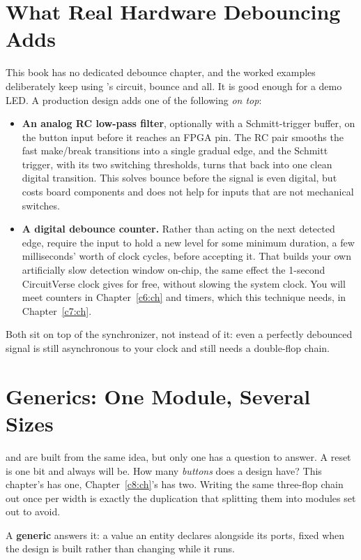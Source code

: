 \section{What Real Hardware Debouncing Adds}
\label{c4:a7}
This book has no dedicated debounce chapter, and the worked examples deliberately keep using
's circuit, bounce and all. It is good enough for a demo LED. A production design adds
one of the following \emph{on top}:
\begin{itemize}
  \item \textbf{An analog RC low-pass filter}, optionally with a Schmitt-trigger buffer, on the
    button input before it reaches an FPGA pin. The RC pair smooths the fast make/break transitions
    into a single gradual edge, and the Schmitt trigger, with its two switching thresholds, turns
    that back into one clean digital transition. This solves bounce before the signal is even
    digital, but costs board components and does not help for inputs that are not mechanical
    switches.
  \item \textbf{A digital debounce counter.} Rather than acting on the next detected edge, require
    the input to hold a new level for some minimum duration, a few milliseconds' worth of clock
    cycles, before accepting it. That builds your own artificially slow detection window on-chip,
    the same effect the 1-second CircuitVerse clock gives for free, without slowing the system
    clock. You will meet counters in Chapter~\ref{c6:ch} and timers, which this technique needs, in
    Chapter~\ref{c7:ch}.
\end{itemize}
Both sit on top of the synchronizer, not instead of it: even a perfectly debounced signal is still
asynchronous to your clock and still needs a double-flop chain.

\section{Generics: One Module, Several Sizes}
\label{c4:a8}
 and  are built from the same idea, but only one has a question
to answer. A reset is one bit and always will be. How many \emph{buttons} does a design have? This
chapter's  has one, Chapter~\ref{c8:ch}'s  has two. Writing the
same three-flop chain out once per width is exactly the duplication that splitting them into
modules set out to avoid.

A \textbf{generic} answers it: a value an entity declares alongside its ports, fixed when the design
is built rather than changing while it runs.

